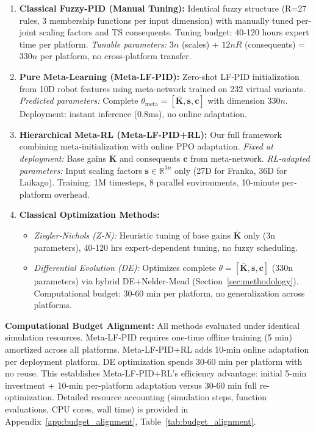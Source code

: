 \documentclass[DTMColor]{ROB-New}
\begin{document}
\begin{enumerate}[leftmargin=*, itemsep=3pt]
    \item \textbf{Classical Fuzzy-PID (Manual Tuning):} Identical fuzzy structure (R=27 rules, 3 membership functions per input dimension) with manually tuned per-joint scaling factors and TS consequents. Tuning budget: 40-120 hours expert time per platform. \textit{Tunable parameters:} $3n$ (scales) + $12nR$ (consequents) = $330n$ per platform, no cross-platform transfer.
    
    \item \textbf{Pure Meta-Learning (Meta-LF-PID):} Zero-shot LF-PID initialization from 10D robot features using meta-network trained on 232 virtual variants. \textit{Predicted parameters:} Complete $\theta_{\text{meta}} = [\bar{\bm{K}}, \bm{s}, \bm{c}]$ with dimension $330n$. Deployment: instant inference (0.8ms), no online adaptation.
    
    \item \textbf{Hierarchical Meta-RL (Meta-LF-PID+RL):} Our full framework combining meta-initialization with online PPO adaptation. \textit{Fixed at deployment:} Base gains $\bar{\bm{K}}$ and consequents $\bm{c}$ from meta-network. \textit{RL-adapted parameters:} Input scaling factors $\bm{s} \in \mathbb{R}^{3n}$ only (27D for Franka, 36D for Laikago). Training: 1M timesteps, 8 parallel environments, 10-minute per-platform overhead.
    
    \item \textbf{Classical Optimization Methods:}
    \begin{itemize}[leftmargin=*, itemsep=1pt]
        \item \textit{Ziegler-Nichols (Z-N):} Heuristic tuning of base gains $\bar{\bm{K}}$ only (3n parameters), 40-120 hrs expert-dependent tuning, no fuzzy scheduling.
        \item \textit{Differential Evolution (DE):} Optimizes complete $\theta = [\bar{\bm{K}}, \bm{s}, \bm{c}]$ (330n parameters) via hybrid DE+Nelder-Mead (Section~\ref{sec:methodology}). Computational budget: 30-60 min per platform, no generalization across platforms.
    \end{itemize}
\end{enumerate}

\textbf{Computational Budget Alignment:} All methods evaluated under identical simulation resources. Meta-LF-PID requires one-time offline training (5 min) amortized across all platforms. Meta-LF-PID+RL adds 10-min online adaptation per deployment platform. DE optimization spends 30-60 min per platform with no reuse. This establishes Meta-LF-PID+RL's efficiency advantage: initial 5-min investment + 10-min per-platform adaptation versus 30-60 min full re-optimization. Detailed resource accounting (simulation steps, function evaluations, CPU cores, wall time) is provided in Appendix~\ref{app:budget_alignment}, Table~\ref{tab:budget_alignment}.
\end{document}
